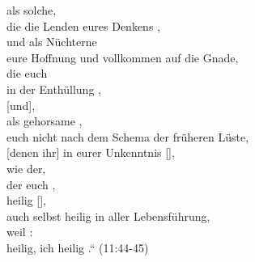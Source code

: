      als solche,\\ 
        die die Lenden eures Denkens ,\\ 
        und als Nüchterne\\ 
             eure Hoffnung  und vollkommen auf die Gnade,\\ 
            die euch  \\
            in der Enthüllung ,\\ 
        [und],\\ 
            als gehorsame , \\
             euch nicht nach dem Schema der früheren Lüste,\\ 
                [denen ihr] in eurer Unkenntnis [],\\ 
     wie der,\\ 
        der euch ,\\ 
            heilig [], \\
             auch selbst heilig in aller Lebensführung,\\ 
            weil :\\
             heilig,  ich heilig .“ (11:44-45)\\ 

